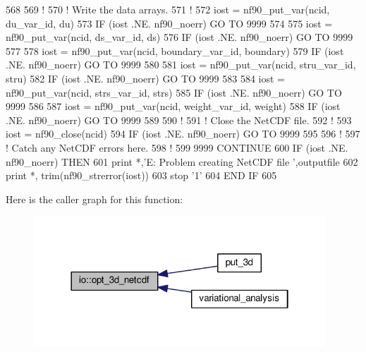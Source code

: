 \begin{DoxyCode}
568 
569     \textcolor{comment}{!}
570     \textcolor{comment}{! Write the data arrays.}
571     \textcolor{comment}{!}
572     iost    = nf90\_put\_var(ncid, du\_var\_id, du)
573     \textcolor{keywordflow}{IF} (iost .NE. nf90\_noerr) \textcolor{keywordflow}{GO TO} 9999
574 
575     iost    = nf90\_put\_var(ncid, ds\_var\_id, ds)
576     \textcolor{keywordflow}{IF} (iost .NE. nf90\_noerr) \textcolor{keywordflow}{GO TO} 9999
577 
578     iost    = nf90\_put\_var(ncid, boundary\_var\_id, boundary)
579     \textcolor{keywordflow}{IF} (iost .NE. nf90\_noerr) \textcolor{keywordflow}{GO TO} 9999
580 
581     iost    = nf90\_put\_var(ncid, stru\_var\_id, stru)
582     \textcolor{keywordflow}{IF} (iost .NE. nf90\_noerr) \textcolor{keywordflow}{GO TO} 9999
583 
584     iost    = nf90\_put\_var(ncid, strs\_var\_id, strs)
585     \textcolor{keywordflow}{IF} (iost .NE. nf90\_noerr) \textcolor{keywordflow}{GO TO} 9999
586 
587     iost    = nf90\_put\_var(ncid, weight\_var\_id, weight)
588     \textcolor{keywordflow}{IF} (iost .NE. nf90\_noerr) \textcolor{keywordflow}{GO TO} 9999
589 
590     \textcolor{comment}{!}
591     \textcolor{comment}{! Close the NetCDF file.}
592     \textcolor{comment}{!}
593     iost    = nf90\_close(ncid)
594     \textcolor{keywordflow}{IF} (iost .NE. nf90\_noerr) \textcolor{keywordflow}{GO TO} 9999
595 
596     \textcolor{comment}{!}
597     \textcolor{comment}{! Catch any NetCDF errors here.}
598     \textcolor{comment}{!}
599     9999 \textcolor{keywordflow}{CONTINUE}
600     \textcolor{keywordflow}{IF} (iost .NE. nf90\_noerr) \textcolor{keywordflow}{THEN}
601         print *,\textcolor{stringliteral}{'E: Problem creating NetCDF file '},outputfile
602         print *, trim(nf90\_strerror(iost))
603         stop \textcolor{stringliteral}{'1'}
604 \textcolor{keywordflow}{    END IF}
605 
\end{DoxyCode}


Here is the caller graph for this function\+:\nopagebreak
\begin{figure}[H]
\begin{center}
\leavevmode
\includegraphics[width=310pt]{namespaceio_a63d1618c60598d1e5ac65348efb74bdc_icgraph}
\end{center}
\end{figure}


